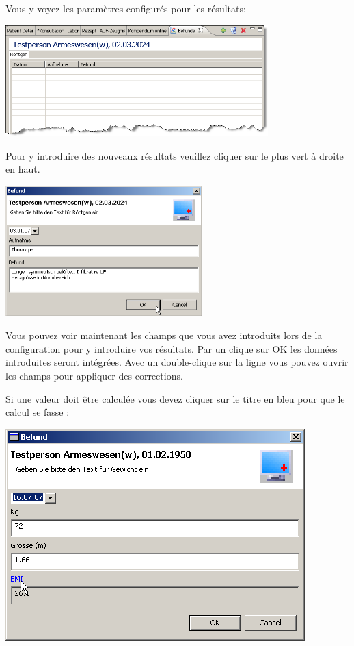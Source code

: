 Vous y voyez les paramètres configurés pour les résultats:
\begin{flushleft}
\includegraphics[width=4in]{images/befunde5.png}
\end{flushleft}
Pour y introduire des nouveaux résultats veuillez cliquer sur le plus vert à droite en haut. 
\begin{flushleft}
\includegraphics[width=3in]{images/befunde6.png}
\end{flushleft}
Vous pouvez voir maintenant les champs que vous avez introduits lors de la configuration pour y introduire vos résultats. Par un clique sur OK les données introduites seront intégrées. Avec un double-clique sur la ligne vous pouvez ouvrir les champs pour appliquer des corrections.

Si une valeur doit être calculée vous devez cliquer sur le titre en bleu pour que le calcul se fasse :\
\begin{center}
\includegraphics{images/befunde8}
\end{center}

